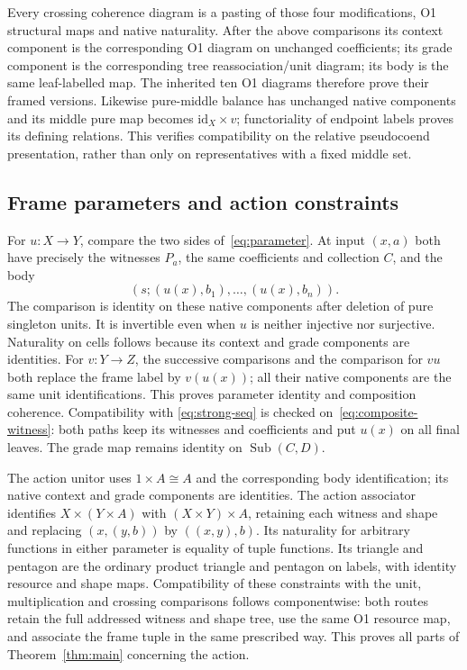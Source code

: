 \documentclass[11pt,a4paper]{article}
\theoremstyle{definition}
\newcommand{\id}{\mathrm{id}}
\newcommand{\Sub}{\operatorname{Sub}}
\begin{document}
Every crossing coherence diagram is a pasting of those four modifications,
O1 structural maps and native naturality. After the above comparisons its
context component is the corresponding O1 diagram on unchanged coefficients;
its grade component is the corresponding tree reassociation/unit diagram;
its body is the same leaf-labelled map. The inherited ten O1 diagrams
therefore prove their framed versions. Likewise pure-middle balance has
unchanged native components and its middle pure map becomes
$\id_X\times v$; functoriality of endpoint labels proves its defining
relations. This verifies compatibility on the relative pseudocoend
presentation, rather than only on representatives with a fixed middle set.

\subsection{Frame parameters and action constraints}
For $u:X\to Y$, compare the two sides of~\eqref{eq:parameter}.
At input $(x,a)$ both have precisely the witnesses $P_a$, the same
coefficients and collection $C$, and the body
\[
 (s;(u(x),b_1),\ldots,(u(x),b_n)).
\]
The comparison is identity on these native components after deletion of
pure singleton units. It is invertible even when $u$ is neither injective
nor surjective. Naturality on cells follows because its context and grade
components are identities. For $v:Y\to Z$, the successive comparisons
and the comparison for $vu$ both replace the frame label by $v(u(x))$;
all their native components are the same unit identifications. This proves
parameter identity and composition coherence. Compatibility with
\eqref{eq:strong-seq} is checked on~\eqref{eq:composite-witness}:
both paths keep its witnesses and coefficients and put $u(x)$ on all
final leaves. The grade map remains identity on $\Sub(C,D)$.

The action unitor uses $1\times A\cong A$ and the corresponding body
identification; its native context and grade components are identities.
The action associator identifies $X\times(Y\times A)$ with
$(X\times Y)\times A$, retaining each witness and shape and replacing
$(x,(y,b))$ by $((x,y),b)$. Its naturality for arbitrary functions in either
parameter is equality of tuple functions. Its triangle and pentagon are
the ordinary product triangle and pentagon on labels, with identity
resource and shape maps. Compatibility of these constraints with the unit,
multiplication and crossing comparisons follows componentwise: both routes
retain the full addressed witness and shape tree, use the same O1 resource
map, and associate the frame tuple in the same prescribed way. This proves
all parts of Theorem~\ref{thm:main} concerning the action.
\end{document}
